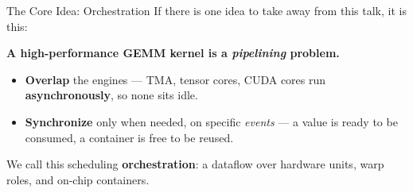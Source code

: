 \documentclass[aspectratio=169,professionalfonts]{beamer}
\begin{document}
\begin{frame}{The Core Idea: Orchestration}
  If there is one idea to take away from this talk, it is this:

  \vspace{0.3cm}
  \begin{center}
    \textbf{A high-performance GEMM kernel is a \emph{pipelining} problem.}
  \end{center}

  \vspace{0.3cm}
  \begin{itemize}
    \item \textbf{Overlap} the engines --- TMA, tensor cores, CUDA cores run
      \textbf{asynchronously}, so none sits idle.
    \item \textbf{Synchronize} only when needed, on specific \emph{events} --- a
      value is ready to be consumed, a container is free to be reused.
  \end{itemize}

  \vspace{0.2cm}
  We call this scheduling \textbf{orchestration}: a dataflow over hardware units,
  warp roles, and on-chip containers.
\end{frame}
\end{document}
